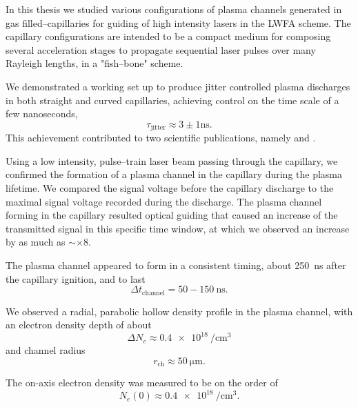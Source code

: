 \documentclass[../main.tex]{subfiles}
\begin{document}
In this thesis we studied various configurations of plasma channels generated in gas filled--capillaries for guiding of high intensity lasers in the LWFA scheme. The capillary configurations are intended to be a compact medium for composing several acceleration stages to propagate sequential laser pulses over many Rayleigh lengths, in a "fish--bone" scheme.

We demonstrated a working set up to produce jitter controlled plasma discharges in both straight and curved capillaries, achieving control on the time scale of a few nanoseconds,
\begin{equation*}
    	\tau_\text{jitter}\approx 3\pm 1\si{\ns}.
\end{equation*}
This achievement contributed to two scientific publications, namely  \cite{andBeharEhudLowCapillary} and \cite{andBeharEhudGasPulse}.

Using a low intensity, pulse--train laser beam passing through the capillary, we confirmed the formation of a plasma channel in the capillary during the plasma lifetime. We compared the signal voltage before the capillary discharge to the maximal signal voltage recorded during the discharge. The plasma channel forming in the capillary resulted optical guiding that caused an increase of the transmitted signal in this specific time window, at which we observed an increase by as much as $\sim \times 8$.

The plasma channel appeared to form in a consistent timing, about \SI{250}{\ns} after the capillary ignition, and to last 
\begin{equation*}
    \Delta t_\text{channel}=50-150\ \si{\ns}.
\end{equation*}

We observed a radial, parabolic hollow density profile in the plasma channel, with an electron density depth of about 
$$\Delta N_e \approx\SI{0.4e18}{\per\cubic\cm}$$
and channel radius
$$r_\text{ch}\approx \SI{50}{\um}.$$

The on-axis electron density was measured to be on the order of $$N_e(0)\approx \SI{0.4e18}{\per\cubic\cm}.$$

\end{document}
